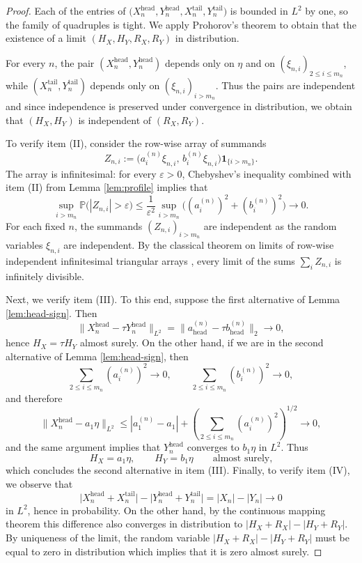 \documentclass[11pt]{amsart}
\begin{document}
\begin{proof}
Each of the entries of $\bigl(
X_n^{\mathrm{head}},
Y_n^{\mathrm{head}},
X_n^{\mathrm{tail}},
Y_n^{\mathrm{tail}}
\bigr)$ is bounded in $L^2$ by one, so the family of
quadruples is tight. We apply Prohorov's theorem to obtain that the existence of a limit $(H_X,H_Y,R_X,R_Y)$ in distribution.

For every $n$, the pair
$(X_n^{\mathrm{head}},Y_n^{\mathrm{head}})$ depends only on $\eta$ and on
$(\xi_{n,i})_{2 \le i \le m_n}$, while
$(X_n^{\mathrm{tail}},Y_n^{\mathrm{tail}})$ depends only on
$(\xi_{n,i})_{i > m_n}$. Thus the pairs are independent and since independence is preserved under convergence in distribution, we obtain that
$(H_X,H_Y)$ is independent of $(R_X,R_Y)$.

To verify item (II), consider the row-wise array of
summands
\[
Z_{n,i}
:=
\bigl(a_i^{(n)} \xi_{n,i},\, b_i^{(n)} \xi_{n,i}\bigr)\mathbf{1}_{\{i>m_n\}}.
\]
The array is infinitesimal: for every $\varepsilon>0$, Chebyshev's inequality combined with item (II) from Lemma \ref{lem:profile} implies that
\[
\sup_{i>m_n}
\mathbb P\bigl(|Z_{n,i}|>\varepsilon\bigr)
\le
\frac{1}{\varepsilon^2}
\sup_{i>m_n}\bigl((a_i^{(n)})^2+(b_i^{(n)})^2\bigr)
\longrightarrow 0.
\]
For each fixed $n$, the summands $(Z_{n,i})_{i > m_n}$ are independent as the random variables $\xi_{n,i}$ are independent. By the classical theorem on limits of
row-wise independent infinitesimal triangular arrays
\cite[Chapter~4]{gnedenko-kolmogorov}, every limit of the
sums $\sum_i Z_{n,i}$ is infinitely divisible.

Next, we verify item (III). To this end, suppose the first alternative of Lemma \ref{lem:head-sign}. Then
\[
\|X_n^{\mathrm{head}} - \tau Y_n^{\mathrm{head}}\|_{L^2}
=
\|a^{(n)}_{\mathrm{head}} - \tau b^{(n)}_{\mathrm{head}}\|_2
\longrightarrow 0,
\]
hence $H_X = \tau H_Y$ almost surely. On the other hand, if we are in the second alternative of Lemma \ref{lem:head-sign}, then
\[
\sum_{2 \le i \le m_n} (a_i^{(n)})^2
\longrightarrow 0,
\qquad
\sum_{2 \le i \le m_n} (b_i^{(n)})^2
\longrightarrow 0,
\]
and therefore
\[
\|X_n^{\mathrm{head}} - a_1 \eta\|_{L^2}
\le
|a_1^{(n)}-a_1|
+
\left(\sum_{2 \le i \le m_n} (a_i^{(n)})^2\right)^{1/2}
\longrightarrow 0,
\]
and the same argument implies that $Y_n^{\mathrm{head}}$ converges to $b_1\eta$ in $L^2$. Thus
\[
H_X = a_1 \eta,
\qquad
H_Y = b_1 \eta
\qquad
\text{almost surely,}
\]
which concludes the second alternative in item (III). Finally, to verify item (IV), we observe that
\[
\bigl|X_n^{\mathrm{head}} + X_n^{\mathrm{tail}}\bigr|
-
\bigl|Y_n^{\mathrm{head}} + Y_n^{\mathrm{tail}}\bigr|
=
|X_n|-|Y_n|
\longrightarrow 0
\]
in $L^2$, hence in probability. On the other hand, by the continuous mapping
theorem this difference also converges in distribution to
$|H_X+R_X|-|H_Y+R_Y|$. By uniqueness of the limit, the random variable $|H_X+R_X|-|H_Y+R_Y|$ must be equal to zero in distribution which implies that it is zero almost surely.
\end{proof}
\end{document}
